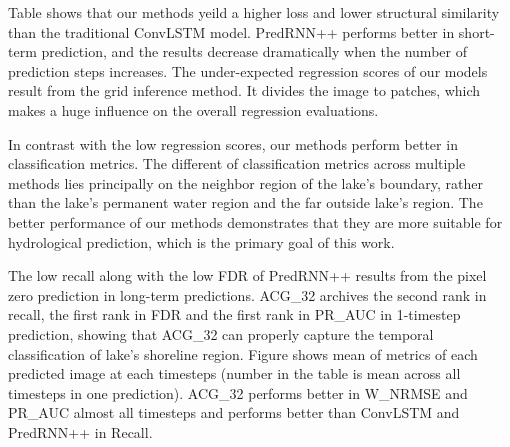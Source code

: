 Table shows that our methods yeild a higher loss and lower structural similarity than the traditional ConvLSTM model. PredRNN++ performs better in short-term prediction, and the results decrease dramatically when the number of prediction steps increases. The under-expected regression scores of our models result from the grid inference method. It divides the image to patches, which makes a huge influence on the overall regression evaluations.

In contrast with the low regression scores, our methods perform better in classification metrics. The different of classification metrics across multiple methods lies principally on the neighbor region of the lake's boundary, rather than the lake's permanent water region and the far outside lake's region. The better performance of our methods demonstrates that they are more suitable for hydrological prediction, which is the primary goal of this work.

The low recall along with the low FDR of PredRNN++ results from the pixel zero prediction in long-term predictions. ACG\_32 archives the second rank in recall, the first rank in FDR and the first rank in PR\_AUC in 1-timestep prediction, showing that ACG\_32 can properly capture the temporal classification of lake's shoreline region. Figure shows mean of metrics of each predicted image at each timesteps (number  in the table is mean across all timesteps in one prediction). ACG\_32 performs better in W\_NRMSE and PR\_AUC almost all timesteps and performs better than ConvLSTM and PredRNN++ in Recall.

